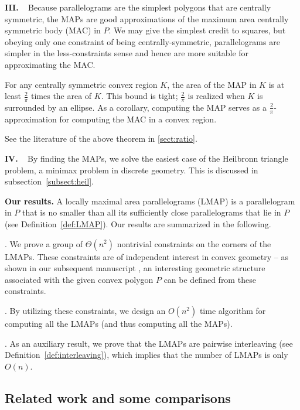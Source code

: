 \documentclass{ws-ijcga}
\begin{document}
\smallskip \noindent\textbf{III.} \mbox{  } Because parallelograms are the simplest polygons that are centrally symmetric, the MAPs are good approximations of the maximum area centrally symmetric body (MAC) in $P$.
We may give the simplest credit to squares, but obeying only one constraint of being centrally-symmetric,
  parallelograms are simpler in the less-constraints sense and hence are more suitable for approximating the MAC.
\begin{theorem}\cite{Math-Sas-CM39,Math-Dow-AMS44}\label{theorem:approx}
For any centrally symmetric convex region $K$, the area of the MAP in $K$ is at least $\frac{2}{\pi}$ times the area of $K$.
  This bound is tight; $\frac{2}{\pi}$ is realized when $K$ is surrounded by an ellipse.
  As a corollary, computing the MAP serves as a $\frac{2}{\pi}$-approximation for computing the MAC in a convex region.
\end{theorem}

See the literature of the above theorem in \ref{sect:ratio}.\smallskip

\smallskip \noindent\textbf{IV.} \mbox{  }  By finding the MAPs, we solve the easiest case of the Heilbronn triangle problem, a minimax problem in discrete geometry. This is discussed in subsection~\ref{subsect:heil}.

\medskip \noindent\textbf{Our results.}
   A locally maximal area parallelograms (LMAP) is a parallelogram in $P$ that is no smaller than all its sufficiently close parallelograms that lie in $P$ (see Definition~\ref{def:LMAP}). Our results are summarized in the following.

   .  We prove a group of $\Theta(n^2)$ nontrivial constraints on the corners of the LMAPs.
      These constraints are of independent interest in convex geometry --
       as shown in our subsequent manuscript \cite{followup-MAP-arxiv15}, an interesting geometric structure associated with the given convex polygon $P$ can be defined from these constraints.

   . By utilizing these constraints, we design an $O(n^2)$ time algorithm for computing all the LMAPs (and thus computing all the MAPs).

   . As an auxiliary result, we prove that the LMAPs are pairwise interleaving (see Definition~\ref{def:interleaving}),
    which implies that the number of LMAPs is only $O(n)$.

\subsection{Related work and some comparisons}\label{subsect:related}
\end{document}
